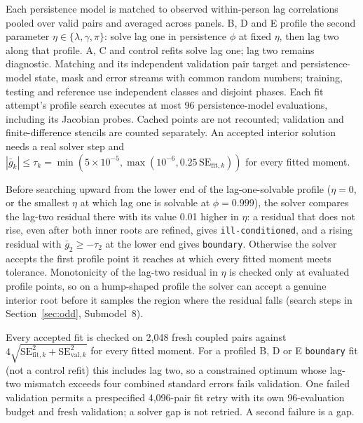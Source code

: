 Each persistence model is matched to observed within-person lag correlations pooled over valid pairs and averaged across panels. B, D and E profile the second parameter $\eta\in\{\lambda,\gamma,\pi\}$: solve lag one in persistence $\phi$ at fixed $\eta$, then lag two along that profile. A, C and control refits solve lag one; lag two remains diagnostic. Matching and its independent validation pair target and persistence-model state, mask and error streams with common random numbers; training, testing and reference use independent classes and disjoint phases. Each fit attempt's profile search executes at most 96 persistence-model evaluations, including its Jacobian probes. Cached points are not recounted; validation and finite-difference stencils are counted separately. An accepted interior solution needs a real solver step and $|\bar g_k|\leq\tau_k=\min(5\times10^{-5},\max(10^{-6},0.25\,\mathrm{SE}_{\mathrm{fit},k}))$ for every fitted moment.

Before searching upward from the lower end of the lag-one-solvable profile ($\eta=0$, or the smallest $\eta$ at which lag one is solvable at $\phi=0.999$), the solver compares the lag-two residual there with its value 0.01 higher in $\eta$: a residual that does not rise, even after both inner roots are refined, gives \texttt{ill-conditioned}, and a rising residual with $\bar g_2\geq-\tau_2$ at the lower end gives \texttt{boundary}. Otherwise the solver accepts the first profile point it reaches at which every fitted moment meets tolerance. Monotonicity of the lag-two residual in $\eta$ is checked only at evaluated profile points, so on a hump-shaped profile the solver can accept a genuine interior root before it samples the region where the residual falls (search steps in Section~\ref{sec:odd}, Submodel~8).

Every accepted fit is checked on 2,048 fresh coupled pairs against $4\sqrt{\mathrm{SE}_{\mathrm{fit},k}^2+\mathrm{SE}_{\mathrm{val},k}^2}$ for every fitted moment. For a profiled B, D or E \texttt{boundary} fit (not a control refit) this includes lag two, so a constrained optimum whose lag-two mismatch exceeds four combined standard errors fails validation. One failed validation permits a prespecified 4,096-pair fit retry with its own 96-evaluation budget and fresh validation; a solver gap is not retried. A second failure is a gap.

